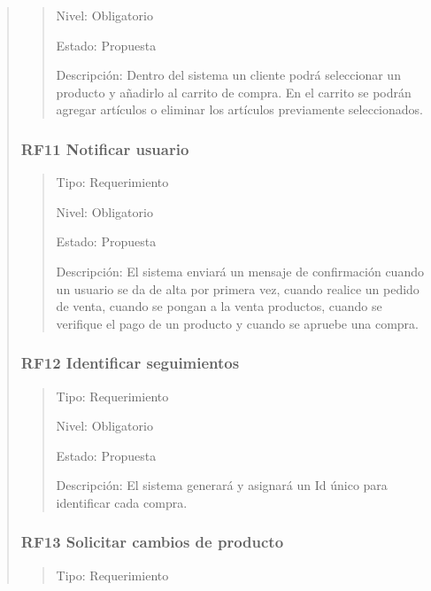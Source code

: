 \documentclass[14pt]{article}
\begin{document}
\begin{quote}
\begin{quote}
                        Nivel: Obligatorio
                        
                        Estado: Propuesta
                        
                        Descripción: Dentro del sistema un cliente podrá seleccionar un producto y añadirlo al carrito de compra. En el carrito se podrán agregar artículos o eliminar los artículos previamente seleccionados.
                    \end{quote}
                \subsubsection{RF11 Notificar usuario}\label{RF11 Notificar usuario}
                    \begin{quote}
                        Tipo: Requerimiento
                        
                        Nivel: Obligatorio
                        
                        Estado: Propuesta
                        
                        Descripción: El sistema enviará un mensaje de confirmación cuando un usuario se da de alta por primera vez, cuando realice un pedido de venta, cuando se pongan a la venta productos, cuando se verifique el pago de un producto y cuando se apruebe una compra.
                    \end{quote}
                \subsubsection{RF12 Identificar seguimientos}\label{RF12 Identificar seguimientos}
                    \begin{quote}
                        Tipo: Requerimiento
                        
                        Nivel: Obligatorio
                        
                        Estado: Propuesta
                        
                        Descripción: El sistema generará y asignará un Id único para identificar cada compra.
                    \end{quote}
                \subsubsection{RF13 Solicitar cambios de producto}\label{RF13 Solicitar cambios de producto}
                    \begin{quote}
                        Tipo: Requerimiento
                        

\end{quote}
\end{quote}
\end{document}
